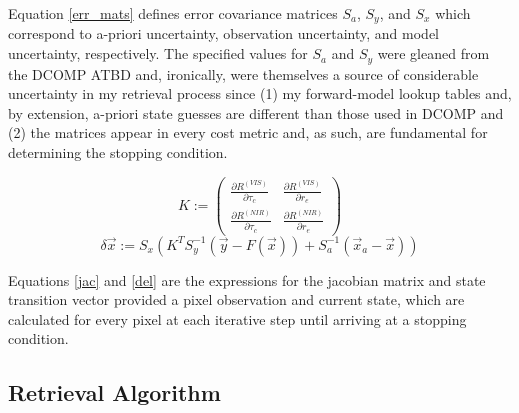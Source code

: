 \documentclass[12pt]{article}
\begin{document}
Equation \ref{err_mats} defines error covariance matrices $S_a$, $S_y$, and $S_x$ which correspond to a-priori uncertainty, observation uncertainty, and model uncertainty, respectively. The specified values for $S_a$ and $S_y$ were gleaned from the DCOMP ATBD and, ironically, were themselves a source of considerable uncertainty in my retrieval process since (1) my forward-model lookup tables and, by extension, a-priori state guesses are different than those used in DCOMP and (2) the matrices appear in every cost metric and, as such, are fundamental for determining the stopping condition.

\begin{equation}\label{jac}
        K := \begin{pmatrix} \frac{\partial R^{(VIS)}}{\partial \tau_c} & \frac{\partial R^{(VIS)}}{\partial r_e} \\ \frac{\partial R^{(NIR)}}{\partial \tau_c} & \frac{\partial R^{(NIR)}}{\partial r_e} \end{pmatrix}
\end{equation}
\begin{equation}\label{del}
        \delta \vec{x} := S_x\left(K^T S_y^{-1} (\vec{y}-F(\vec{x})) + S_a^{-1}(\vec{x}_a-\vec{x})\right)
\end{equation}

Equations \ref{jac} and \ref{del} are the expressions for the jacobian matrix and state transition vector provided a pixel observation and current state, which are calculated for every pixel at each iterative step until arriving at a stopping condition.

\subsection{Retrieval Algorithm}\label{dcomp_algo}
\end{document}
